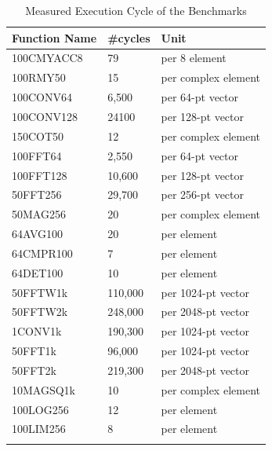 \begin{longtable}{|l|l|l|}
		\hline
		\textbf{Function Name} & \textbf{\#cycles} & \textbf{Unit}  \TBstrut \\ \hline
		100CMYACC8 & 79 & per 8 element \TBstrut \\ \hline
		100RMY50 & 15 & per complex element \TBstrut \\ \hline
		100CONV64 & 6,500 & per 64-pt vector  \TBstrut \\ \hline
		100CONV128 & 24100 & per 128-pt vector \TBstrut \\ \hline
		150COT50 & 12 & per complex element \TBstrut \\ \hline
		100FFT64 & 2,550 & per 64-pt vector \TBstrut \\ \hline
		100FFT128 & 10,600 & per 128-pt vector \TBstrut \\ \hline
		50FFT256 & 29,700 &  per 256-pt vector \TBstrut \\ \hline
		50MAG256 & 20 & per complex element \TBstrut \\ \hline
		64AVG100 & 20 & per element \TBstrut \\ \hline
		64CMPR100 & 7 & per element \TBstrut \\ \hline
		64DET100 & 10 & per element  \TBstrut \\ \hline
		50FFTW1k & 110,000 & per 1024-pt vector \TBstrut \\ \hline
		50FFTW2k & 248,000 & per 2048-pt vector \TBstrut \\ \hline
		1CONV1k & 190,300 & per 1024-pt vector \TBstrut \\ \hline
		50FFT1k & 96,000 & per 1024-pt vector \TBstrut \\ \hline
		50FFT2k & 219,300 & per 2048-pt vector \TBstrut \\ \hline
		10MAGSQ1k & 10 & per complex element \TBstrut \\ \hline
		100LOG256 & 12 & per element \TBstrut \\ \hline
		100LIM256 &  8 & per element \TBstrut \\ \hline
		\caption{Measured Execution Cycle of the Benchmarks}
		\label{tbl:aa_exe}
\end{longtable}

